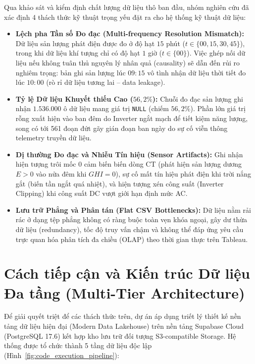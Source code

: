 \documentclass[12pt, a4paper]{report}
\begin{document}
Qua khảo sát và kiểm định chất lượng dữ liệu thô ban đầu, nhóm nghiên cứu đã xác định 4 thách thức kỹ thuật trọng yếu đặt ra cho hệ thống kỹ thuật dữ liệu:

\begin{itemize}[leftmargin=*]
    \item \textbf{Lệch pha Tần số Đo đạc (Multi-frequency Resolution Mismatch):} Dữ liệu sản lượng phát điện được đo ở độ hạt $15$ phút ($t \in \{00, 15, 30, 45\}$), trong khi dữ liệu khí tượng chỉ có độ hạt $1$ giờ ($t \in \{00\}$). Việc ghép nối dữ liệu nếu không tuân thủ nguyên lý nhân quả (causality) sẽ dẫn đến rủi ro nghiêm trọng: bản ghi sản lượng lúc $09:15$ vô tình nhận dữ liệu thời tiết đo lúc $10:00$ (rò rỉ dữ liệu tương lai -- data leakage).
    
    \item \textbf{Tỷ lệ Dữ liệu Khuyết thiếu Cao ($56{,}2\%$):} Chuỗi đo đạc sản lượng ghi nhận $1.536.000$ ô dữ liệu mang giá trị \texttt{NULL} (chiếm $56{,}2\%$). Phần lớn giá trị rỗng xuất hiện vào ban đêm do Inverter ngắt mạch để tiết kiệm năng lượng, song có tới 561 đoạn đứt gãy gián đoạn ban ngày do sự cố viễn thông telemetry truyền dữ liệu.
    
    \item \textbf{Dị thường Đo đạc và Nhiễu Tín hiệu (Sensor Artifacts):} Ghi nhận hiện tượng trôi mốc 0 cảm biến biến dòng CT (phát hiện sản lượng dương $E > 0$ vào nửa đêm khi $GHI = 0$), sự cố mất tín hiệu phát điện khi trời nắng gắt (biến tần ngắt quá nhiệt), và hiện tượng xén công suất (Inverter Clipping) khi công suất DC vượt giới hạn định mức AC.
    
    \item \textbf{Lưu trữ Phẳng và Phân tán (Flat CSV Bottlenecks):} Dữ liệu nằm rải rác ở dạng tệp phẳng không có ràng buộc toàn vẹn khóa ngoại, gây dư thừa dữ liệu (redundancy), tốc độ truy vấn chậm và không thể đáp ứng yêu cầu trực quan hóa phân tích đa chiều (OLAP) theo thời gian thực trên Tableau.
\end{itemize}

\section{Cách tiếp cận và Kiến trúc Dữ liệu Đa tầng (Multi-Tier Architecture)}
\label{sec:multi_tier_arch}

Để giải quyết triệt để các thách thức trên, dự án áp dụng triết lý thiết kế nền tảng dữ liệu hiện đại (Modern Data Lakehouse) trên nền tảng Supabase Cloud (PostgreSQL 17.6) kết hợp kho lưu trữ đối tượng S3-compatible Storage. Hệ thống được tổ chức thành 5 tầng dữ liệu độc lập (Hình~\ref{fig:code_execution_pipeline}):
\end{document}
